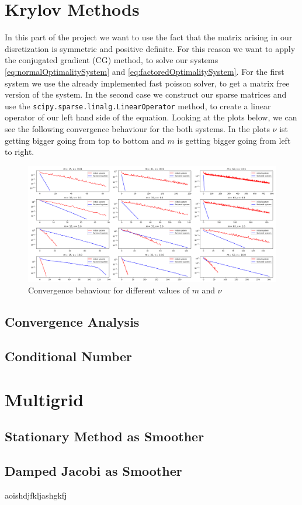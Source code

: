 \documentclass{amsart}
\theoremstyle{definition}
\theoremstyle{remark}
\numberwithin{equation}{section}
\begin{document}
\section{Krylov Methods}
In this part of the project we want to use the fact that the matrix arising in our disretization is symmetric and positive definite. For this reason we want to apply the conjugated gradient (CG) method, to solve our systems \eqref{eq:normalOptimalitySystem} and \eqref{eq:factoredOptimalitySystem}.
For the first system we use the already implemented fast poisson solver, to get a matrix free version of the system. In the second case we construct our sparse matrices and use the \texttt{scipy.sparse.linalg.LinearOperator} method, to create a linear operator of our left hand side of the equation.
Looking at the plots below, we can see the following convergence behaviour for the both systems. In the plots $\nu$ ist getting bigger going from top to bottom and $m$ is getting bigger going from left to right.
\begin{figure}[h!]
\centering
\includegraphics[scale=0.37]{./imgs/CG_analysis}
\caption{Convergence behaviour for different values of $m$ and $\nu$}
\end{figure}

\subsection{Convergence Analysis}


\subsection{Conditional Number}


\section{Multigrid}


\subsection{Stationary Method as Smoother}


\subsection{Damped Jacobi as Smoother}
aoishdjfkljashgkfj
\end{document}
